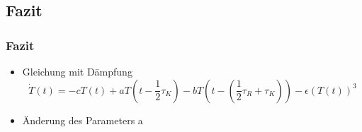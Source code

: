 \documentclass{beamer}
\begin{document}
\subsection{Fazit}
\begin{frame}
\frametitle{Fazit}
\begin{itemize}
	\item[] Gleichung mit Dämpfung
	\begin{equation}
	\dot{T}(t)=-cT(t)+aT(t-\frac{1}{2}\tau_K)-bT(t-(\frac{1}{2}\tau_R+\tau_K))-\epsilon(T(t))^3
	\end{equation}
	\pause
	\item[] Änderung des Parameters a
	
\end{itemize}
\end{frame}
\end{document}

